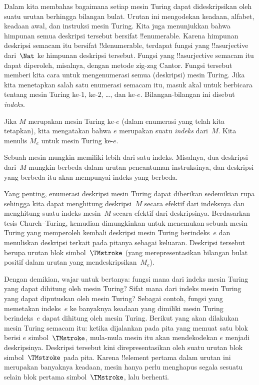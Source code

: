 \documentclass[../../../include/open-logic-section]{subfiles}
\begin{document}

Dalam  kita membahas bagaimana setiap mesin Turing dapat
dideskripsikan oleh suatu urutan berhingga bilangan bulat. Urutan ini
mengodekan keadaan, alfabet, keadaan awal, dan instruksi mesin Turing. Kita
juga menunjukkan bahwa himpunan semua deskripsi tersebut bersifat
!!{enumerable}. Karena himpunan deskripsi semacam itu bersifat !!{denumerable},
terdapat fungsi yang !!a{surjective} dari~$\Nat$ ke himpunan deskripsi
tersebut. Fungsi yang !!a{surjective} semacam itu dapat diperoleh, misalnya,
dengan metode zig-zag Cantor. Fungsi tersebut memberi kita cara untuk
mengenumerasi semua (deskripsi) mesin Turing. Jika kita menetapkan salah satu
enumerasi semacam itu, masuk akal untuk berbicara tentang mesin Turing ke-$1$,
ke-$2$, \dots, dan ke-$e$. Bilangan-bilangan ini disebut \emph{indeks}.

\begin{defn}
Jika $M$ merupakan mesin Turing ke-$e$ (dalam enumerasi yang telah kita
tetapkan), kita mengatakan bahwa $e$ merupakan suatu \emph{indeks} dari~$M$.
Kita menulis $M_e$ untuk mesin Turing ke-$e$.
\end{defn}

Sebuah mesin mungkin memiliki lebih dari satu indeks. Misalnya, dua deskripsi
dari~$M$ mungkin berbeda dalam urutan pencantuman instruksinya, dan deskripsi
yang berbeda itu akan mempunyai indeks yang berbeda.

Yang penting, enumerasi deskripsi mesin Turing dapat diberikan sedemikian rupa
sehingga kita dapat menghitung deskripsi~$M$ secara efektif dari indeksnya dan
menghitung suatu indeks mesin~$M$ secara efektif dari deskripsinya. Berdasarkan
tesis Church--Turing, kemudian dimungkinkan untuk menemukan sebuah mesin
Turing yang memperoleh kembali deskripsi mesin Turing berindeks~$e$ dan
menuliskan deskripsi terkait pada pitanya sebagai keluaran. Deskripsi tersebut
berupa urutan blok simbol~$\TMstroke$ (yang merepresentasikan bilangan bulat
positif dalam urutan yang mendeskripsikan~$M_e$).

Dengan demikian, wajar untuk bertanya: fungsi mana dari indeks mesin Turing
yang dapat dihitung oleh mesin Turing? Sifat mana dari indeks mesin Turing yang
dapat diputuskan oleh mesin Turing? Sebagai contoh, fungsi yang memetakan
indeks~$e$ ke banyaknya keadaan yang dimiliki mesin Turing berindeks~$e$ dapat
dihitung oleh mesin Turing. Berikut yang akan dilakukan mesin Turing semacam
itu: ketika dijalankan pada pita yang memuat satu blok berisi $e$
simbol~$\TMstroke$, mula-mula mesin itu akan mendekodekan $e$ menjadi
deskripsinya. Deskripsi tersebut kini direpresentasikan oleh suatu urutan blok
simbol~$\TMstroke$ pada pita. Karena !!{element} pertama dalam urutan ini
merupakan banyaknya keadaan, mesin hanya perlu menghapus segala sesuatu selain
blok pertama simbol~$\TMstroke$, lalu berhenti.
\end{document}
